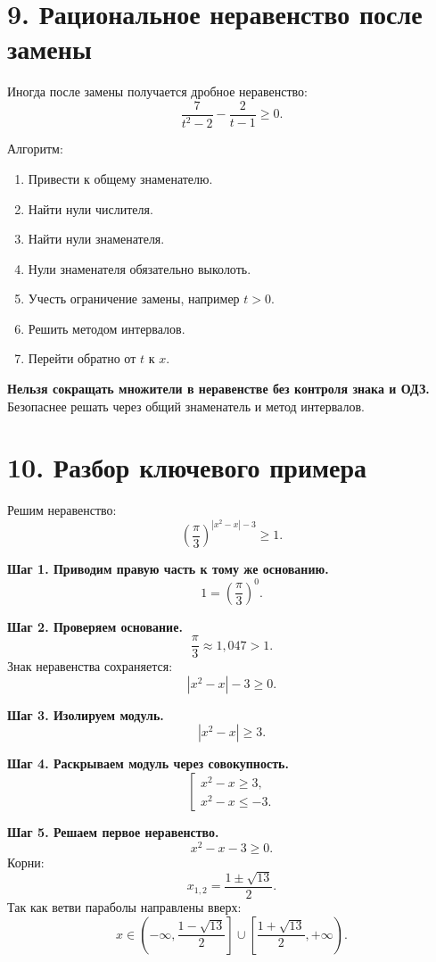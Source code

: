\documentclass[a4paper,12pt]{article}
\newcommand{\sectionline}{\vspace{2mm}{\color{accent}\hrule height 0.6pt}\vspace{2mm}}
\newcommand{\important}[1]{\textcolor{darkaccent}{\textbf{#1}}}
\begin{document}
\section*{9. Рациональное неравенство после замены}
\sectionline

Иногда после замены получается дробное неравенство:
\[
\frac{7}{t^2-2}-\frac{2}{t-1}\ge 0.
\]

Алгоритм:
\begin{enumerate}
    \item Привести к общему знаменателю.
    \item Найти нули числителя.
    \item Найти нули знаменателя.
    \item Нули знаменателя обязательно выколоть.
    \item Учесть ограничение замены, например \(t>0\).
    \item Решить методом интервалов.
    \item Перейти обратно от \(t\) к \(x\).
\end{enumerate}

\important{Нельзя сокращать множители в неравенстве без контроля знака и ОДЗ.} Безопаснее решать через общий знаменатель и метод интервалов.

\section*{10. Разбор ключевого примера}
\sectionline

Решим неравенство:
\[
\left(\frac{\pi}{3}\right)^{|x^2-x|-3}\ge 1.
\]

\textbf{Шаг 1. Приводим правую часть к тому же основанию.}
\[
1=\left(\frac{\pi}{3}\right)^0.
\]

\textbf{Шаг 2. Проверяем основание.}
\[
\frac{\pi}{3}\approx 1{,}047>1.
\]
Знак неравенства сохраняется:
\[
|x^2-x|-3\ge 0.
\]

\textbf{Шаг 3. Изолируем модуль.}
\[
|x^2-x|\ge 3.
\]

\textbf{Шаг 4. Раскрываем модуль через совокупность.}
\[
\left[
\begin{array}{l}
x^2-x\ge 3,\\
x^2-x\le -3.
\end{array}
\right.
\]

\textbf{Шаг 5. Решаем первое неравенство.}
\[
x^2-x-3\ge 0.
\]
Корни:
\[
x_{1,2}=\frac{1\pm\sqrt{13}}{2}.
\]
Так как ветви параболы направлены вверх:
\[
x\in
\left(-\infty,\frac{1-\sqrt{13}}{2}\right]
\cup
\left[\frac{1+\sqrt{13}}{2},+\infty\right).
\]
\end{document}
